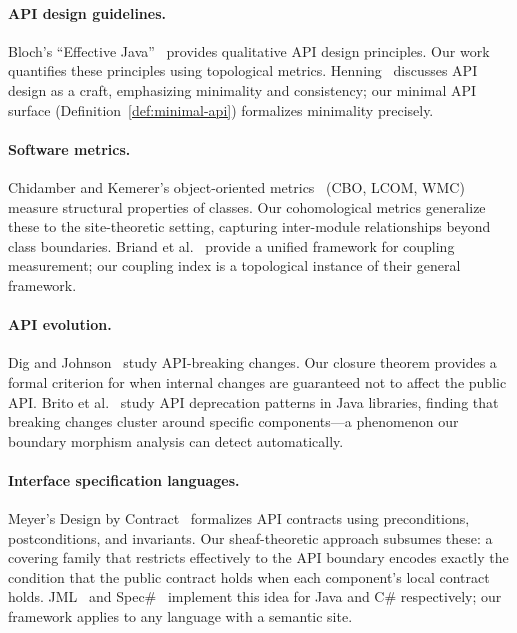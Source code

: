 \documentclass[11pt]{article}
\begin{document}
\paragraph{API design guidelines.}
Bloch's ``Effective Java''~\cite{Bloch2006} provides qualitative API
design principles.  Our work quantifies these principles using topological
metrics.  Henning~\cite{Henning2009} discusses API design as a craft,
emphasizing minimality and consistency; our minimal API surface
(Definition~\ref{def:minimal-api}) formalizes minimality precisely.

\paragraph{Software metrics.}
Chidamber and Kemerer's object-oriented metrics~\cite{CK1994} (CBO, LCOM,
WMC) measure structural properties of classes.  Our cohomological metrics
generalize these to the site-theoretic setting, capturing inter-module
relationships beyond class boundaries.  Briand et al.~\cite{Briand1999}
provide a unified framework for coupling measurement; our coupling index
is a topological instance of their general framework.

\paragraph{API evolution.}
Dig and Johnson~\cite{Dig2006} study API-breaking changes.  Our closure
theorem provides a formal criterion for when internal changes are guaranteed
not to affect the public API.  Brito et al.~\cite{Brito2018} study API
deprecation patterns in Java libraries, finding that breaking changes
cluster around specific components---a phenomenon our boundary morphism
analysis can detect automatically.

\paragraph{Interface specification languages.}
Meyer's Design by Contract~\cite{Meyer1992} formalizes API contracts using
preconditions, postconditions, and invariants.  Our sheaf-theoretic
approach subsumes these: a covering family that restricts effectively to
the API boundary encodes exactly the condition that the public contract
holds when each component's local contract holds.  JML~\cite{Leavens2006}
and Spec\#~\cite{Barnett2004} implement this idea for Java and C\#
respectively; our framework applies to any language with a semantic site.
\end{document}
